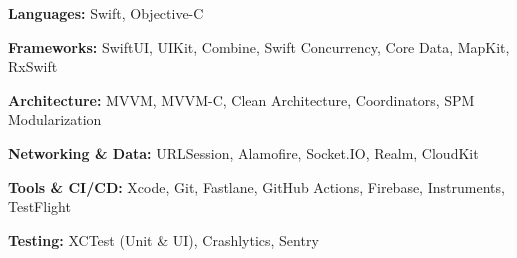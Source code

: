 {\small
\textbf{Languages:} Swift, Objective-C

\smallskip
\textbf{Frameworks:} SwiftUI, UIKit, Combine, Swift Concurrency, Core Data, MapKit, RxSwift

\smallskip
\textbf{Architecture:} MVVM, MVVM-C, Clean Architecture, Coordinators, SPM Modularization

\smallskip
\textbf{Networking \& Data:} URLSession, Alamofire, Socket.IO, Realm, CloudKit

\smallskip
\textbf{Tools \& CI/CD:} Xcode, Git, Fastlane, GitHub Actions, Firebase, Instruments, TestFlight

\smallskip
\textbf{Testing:} XCTest (Unit \& UI), Crashlytics, Sentry
\par}
